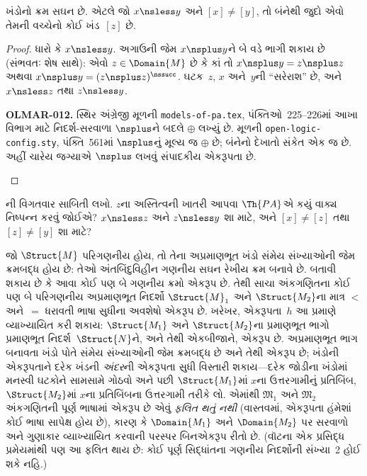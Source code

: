 \begin{prop}
ખંડોનો ક્રમ સઘન છે. એટલે જો $x\nsless y$ અને $[x]\neq[y]$, તો બંનેથી
જુદો એવો તેમની વચ્ચેનો કોઈ ખંડ~$[z]$ છે.
\end{prop}

\begin{proof}
ધારો કે $x\nsless y$. અગાઉની જેમ $x\nsplus y$ને બે વડે ભાગી શકાય છે
(સંભવતઃ શેષ સાથે): એવો $z\in\Domain{M}$ છે કે કાં તો
$x\nsplus y=z\nsplus z$ અથવા
$x\nsplus y=(z\nsplus z)^\nssucc$. ઘટક~$z$, $x$ અને~$y$ની
``સરેરાશ'' છે, અને $x\nsless z$ તથા $z\nsless y$.
\begin{editorial}
\textbf{OLMAR-012.} સ્થિર અંગ્રેજી મૂળની \texttt{models-of-pa.tex}, પંક્તિઓ~225--226માં આખા વિભાગ માટે નિદર્શ-સરવાળા $\nsplus$ને બદલે $\oplus$ લખ્યું છે. મૂળની \texttt{open-logic-config.sty}, પંક્તિ~561માં $\nsplus$નું મૂલ્ય જ $\oplus$ છે; બંનેનો દેખાતો સંકેત એક જ છે. અહીં ચારેય જગ્યાએ $\nsplus$ લખવું સંપાદકીય એકરૂપતા છે.
\end{editorial}
\end{proof}

\begin{prob}
ની વિગતવાર સાબિતી લખો.
$z$ના અસ્તિત્વની ખાતરી આપવા $\Th{PA}$એ કયું વાક્ય નિષ્પન્ન
કરવું જોઈએ? $x\nsless z$ અને $z\nsless y$ શા માટે, અને
$[x]\neq[z]$ તથા $[z]\neq[y]$ શા માટે?
\end{prob}

\begin{explain}
જો $\Struct{M}$ પરિગણનીય હોય, તો તેના અપ્રમાણભૂત ખંડો સંમેય
સંખ્યાઓની જેમ ક્રમબદ્ધ હોય છે: તેઓ અંતબિંદુવિહીન ગણનીય
સઘન રેખીય ક્રમ બનાવે છે. બતાવી શકાય છે કે આવા કોઈ પણ બે
ગણનીય ક્રમો એકરૂપ છે. તેથી સાચા અંકગણિતના કોઈ પણ બે
પરિગણનીય અપ્રમાણભૂત નિદર્શો $\Struct{M}_1$ અને
$\Struct{M_2}$ના માત્ર $<$ અને~$=$ ધરાવતી ભાષા સુધીના અવશેષો એકરૂપ
છે. ખરેખર, એકરૂપતા~$h$ આ પ્રમાણે વ્યાખ્યાયિત કરી શકાય: $\Struct{M_1}$
અને $\Struct{M_2}$ના પ્રમાણભૂત ભાગો પ્રમાણભૂત નિદર્શ~$\Struct{N}$ને,
અને તેથી એકબીજાને, એકરૂપ છે. અપ્રમાણભૂત ભાગ બનાવતા ખંડો પોતે સંમેય
સંખ્યાઓની જેમ ક્રમબદ્ધ છે અને તેથી એકરૂપ છે; ખંડોની એકરૂપતાને દરેક
ખંડની \emph{અંદર}ની એકરૂપતા સુધી વિસ્તારી શકાય—દરેક જોડીના ખંડોમાં
મનસ્વી ઘટકોને સામસામે ગોઠવો અને પછી $\Struct{M_1}$માં $x$ના
ઉત્તરગામીનું પ્રતિબિંબ, $\Struct{M_2}$માં $x$ના પ્રતિબિંબના ઉત્તરગામી
તરીકે લો. એમાંથી $\mathfrak{M}_1$ અને $\mathfrak{M}_2$ અંકગણિતની
પૂર્ણ ભાષામાં એકરૂપ છે એવું \emph{ફલિત થતું નથી} (વાસ્તવમાં,
એકરૂપતા હંમેશાં કોઈ ભાષા સાપેક્ષ હોય છે), કારણ કે
$\Domain{M_1}$ અને $\Domain{M_2}$ પર સરવાળો અને ગુણાકાર વ્યાખ્યાયિત
કરવાની પરસ્પર બિનએકરૂપ રીતો છે. (વૉટના એક પ્રસિદ્ધ પ્રમેયમાંથી પણ આ
ફલિત થાય છે: કોઈ પૂર્ણ સિદ્ધાંતના ગણનીય નિદર્શોની સંખ્યા~2 હોઈ શકે
નહિ.)
\end{explain}
\endgroup


